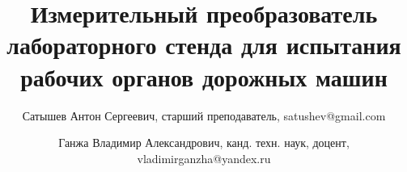 \newcommand{\mainAuthor}{Сатышев Антон Сергеевич}
\newcommand{\articleTitle}{Измерительный преобразователь лабораторного стенда для испытания рабочих органов дорожных машин}
\newcommand{\keywords}{снежно-ледяные образования, дисковый режущий инструмент, силовые параметры, радиус закругления, лёд, радиус закругления рабой кромки}


\author{\mainAuthor, старший преподаватель, satushev@gmail.com}
\author{Ганжа Владимир Александрович, канд. техн. наук, доцент, vladimirganzha@yandex.ru}

\title{\articleTitle}
\date{}~